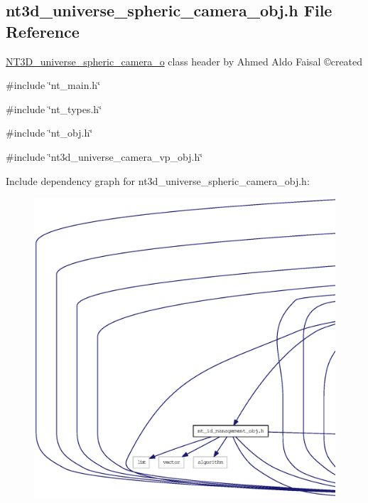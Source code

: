 \subsection{nt3d\_\-universe\_\-spheric\_\-camera\_\-obj.h File Reference}
\label{nt3d__universe__spheric__camera__obj_8h}



\begin{DoxyItemize}
\item \hyperlink{class_n_t3_d__universe__spheric__camera__o}{NT3D\_\-universe\_\-spheric\_\-camera\_\-o} class header by Ahmed Aldo Faisal \copyright created 
\end{DoxyItemize} 


{\ttfamily \#include \char`\"{}nt\_\-main.h\char`\"{}}\par
{\ttfamily \#include \char`\"{}nt\_\-types.h\char`\"{}}\par
{\ttfamily \#include \char`\"{}nt\_\-obj.h\char`\"{}}\par
{\ttfamily \#include \char`\"{}nt3d\_\-universe\_\-camera\_\-vp\_\-obj.h\char`\"{}}\par
Include dependency graph for nt3d\_\-universe\_\-spheric\_\-camera\_\-obj.h:
\nopagebreak
\begin{figure}[H]
\begin{center}
\leavevmode
\includegraphics[width=400pt]{nt3d__universe__spheric__camera__obj_8h__incl}
\end{center}
\end{figure}
